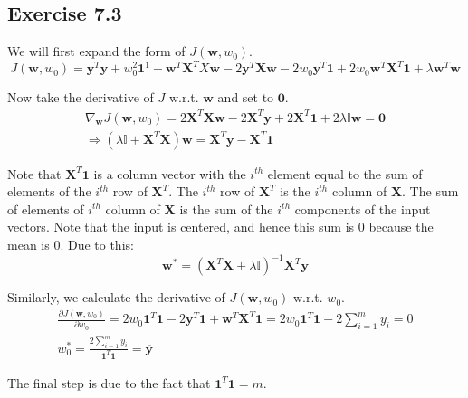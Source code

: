 \documentclass{article}
\newcommand{\vct}[1]{\mathbf{#1}}
\begin{document}
\subsection*{Exercise 7.3}
\begin{flushleft}
We will first expand the form of \(J(\mathbf{w}, w_{0})\).
\begin{equation}
J(\mathbf{w}, w_{0}) = \vct{y}^{T}\vct{y} + w_{0}^{2}\vct{1}^{1} + \vct{w}^{T}\vct{X}^{T}X\vct{w} - 2\vct{y}^{T}\vct{X}\vct{w} - 2w_{0}\vct{y}^{T}\vct{1} + 2w_{0}\vct{w}^{T}\vct{X}^{T}\vct{1} + \lambda \vct{w}^{T}\vct{w}
\end{equation}

Now take the derivative of \(J\) w.r.t. \(\vct{w}\) and set to \(\vct{0}\).
\begin{gather}
\nabla_{\vct{w}} J(\vct{w}, w_{0}) = 2\vct{X}^{T}\vct{X}\vct{w} - 2\vct{X}^{T}\vct{y} + 2\vct{X}^{T}\vct{1} + 2\lambda\mathbb{I}\vct{w} = \vct{0} \\
\Rightarrow (\lambda \mathbb{I} + \vct{X}^{T}\vct{X})\vct{w} = \vct{X}^{T}\vct{y} - \vct{X}^{T}\vct{1}
\end{gather}

Note that \(\vct{X}^{T}\vct{1}\) is a column vector with the \(i^{th}\) element equal to the sum of elements of the \(i^{th}\) row of \(\vct{X}^{T}\). The \(i^{th}\) row of \(\vct{X}^{T}\) is the \(i^{th}\) column of \(\vct{X}\). The sum of elements of \(i^{th}\) column of \(\vct{X}\) is the sum of the \(i^{th}\) components of the input vectors. Note that the input is centered, and hence this sum is \(0\) because the mean is \(0\). Due to this:
\begin{equation}
\vct{w}^{*} = (\vct{X}^{T}\vct{X} + \lambda \mathbb{I})^{-1} \vct{X}^{T}\vct{y}
\end{equation}

Similarly, we calculate the derivative of \(J(\vct{w}, w_{0})\) w.r.t. \(w_{0}\).
\begin{gather}
\frac{\partial J(\vct{w}, w_{0})}{\partial w_{0}} = 2w_{0}\vct{1}^{T}\vct{1} - 2\vct{y}^{T}\vct{1} + \vct{w}^{T}\vct{X}^{T}\vct{1} = 2w_{0}\vct{1}^{T}\vct{1} - \displaystyle 2\sum_{i=1}^{m}y_{i} = 0\\
w_{0}^{*} = \frac{\displaystyle 2\sum_{i=1}^{m}y_{i}}{\vct{1}^{T}\vct{1}} = \overline{\vct{y}}
\end{gather}

The final step is due to the fact that \(\vct{1}^{T}\vct{1} = m\).
\end{flushleft}
\end{document}
